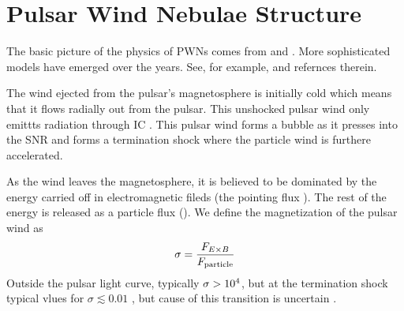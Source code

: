 \section{Pulsar Wind Nebulae Structure}


The basic picture of the physics of \acp{PWN}
comes from \cite{rees_1974_origin-magnetic} and
\cite{kennel_1984_magnetohydrodynamic-model}.  More 
sophisticated models have emerged over the years.  See, for example,
\cite{gelfand_2009_dynamical-model} and refernces therein.

The wind ejected from the pulsar's magnetosphere is initially
cold which means that it flows radially out from the pulsar.
This unshocked pulsar wind only emittts radiation through \ac{IC}
\citep{bogovalov_2000_very-high-energy-gamma}.  This pulsar wind forms
a bubble as it presses into the \ac{SNR} and forms a termination shock
where the particle wind is furthere accelerated.


As the wind leaves the magnetosphere, it is believed to be dominated
by the energy carried off in electromagnetic fileds (the pointing flux
\pointingflux).  The rest of the energy is released as a particle flux
(\particleflux).  We define the magnetization of the pulsar wind as
\begin{equation}
  \sigma = \frac{F_{E\times B}}{F_\text{particle}}
\end{equation}
Outside the pulsar light curve, typically $\sigma>10^4$,
but at the termination shock typical vlues for $\sigma\lesssim0.01$
\cite{kennel_1984a_confinement-pulsars},
but cause of this transition is uncertain \citep{gaensler_2006_evolution-structure}.

